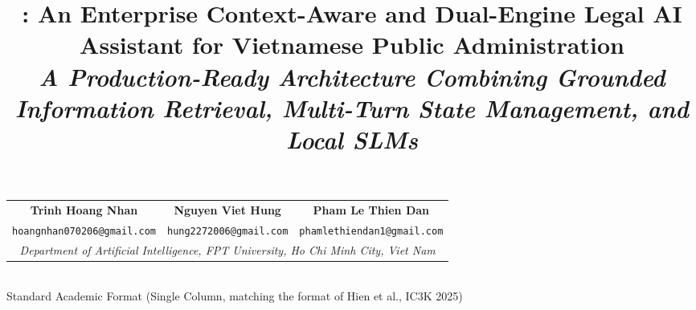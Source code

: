 \documentclass[11pt,a4paper]{article}
\title{\vspace{-1.2cm}\bfseries \sys{}: An Enterprise Context-Aware and Dual-Engine
Legal AI Assistant for Vietnamese Public Administration\\[4pt]
\large\normalfont\itshape A Production-Ready Architecture Combining Grounded Information
Retrieval, Multi-Turn State Management, and Local SLMs}
\date{}
\begin{document}
\maketitle
\vspace{-1.0cm}

\begin{center}
\small
\begin{tabular}{ccc}
\textbf{Trinh Hoang Nhan} & \textbf{Nguyen Viet Hung} & \textbf{Pham Le Thien Dan}\\
\texttt{hoangnhan070206@gmail.com} & \texttt{hung2272006@gmail.com} & \texttt{phamlethiendan1@gmail.com}\\
\multicolumn{3}{c}{\textit{Department of Artificial Intelligence, FPT University, Ho Chi Minh City, Viet Nam}}\\
\end{tabular}\\[2pt]
\footnotesize Standard Academic Format (Single Column, matching the format of Hien et al., IC3K 2025)
\end{center}
\end{document}
